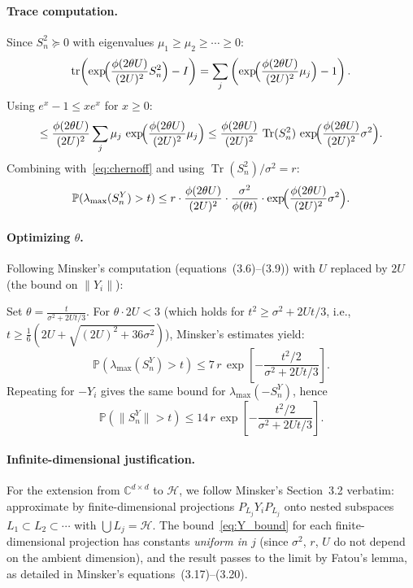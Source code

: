 \documentclass[11pt]{article}
\DeclareMathOperator{\Tr}{Tr}
\DeclareMathOperator{\tr}{tr}
\newcommand{\PP}{\mathbb{P}}
\newcommand{\cH}{\mathcal{H}}
\newcommand{\norm}[1]{\|#1\|}
\begin{document}
\paragraph{Trace computation.}
Since $S_n^2\succeq 0$ with eigenvalues $\mu_1\geq\mu_2\geq\cdots\geq 0$:
\[
\tr\!\left(\exp\!\Bigl(\frac{\phi(2\theta U)}{(2U)^2}S_n^2\Bigr)-I\right)
= \sum_j\left(\exp\!\Bigl(\frac{\phi(2\theta U)}{(2U)^2}\mu_j\Bigr)-1\right).
\]
Using $e^x-1\leq xe^x$ for $x\geq 0$:
\[
\leq \frac{\phi(2\theta U)}{(2U)^2}\sum_j\mu_j\,\exp\!\Bigl(\frac{\phi(2\theta U)}{(2U)^2}\mu_j\Bigr)
\leq \frac{\phi(2\theta U)}{(2U)^2}\,\Tr(S_n^2)\,\exp\!\Bigl(\frac{\phi(2\theta U)}{(2U)^2}\sigma^2\Bigr).
\]
Combining with~\eqref{eq:chernoff} and using $\Tr(S_n^2)/\sigma^2=r$:
\begin{equation}\label{eq:combined}
\PP(\lambda_{\max}(S_n^Y)>t)
\leq r\cdot\frac{\phi(2\theta U)}{(2U)^2}\cdot\frac{\sigma^2}{\phi(\theta t)}
\cdot\exp\!\Bigl(\frac{\phi(2\theta U)}{(2U)^2}\sigma^2\Bigr).
\end{equation}

\paragraph{Optimizing $\theta$.}
Following Minsker's computation (equations~(3.6)--(3.9)) with $U$ replaced by $2U$ (the bound on $\norm{Y_i}$):

Set $\theta=\frac{t}{\sigma^2+2Ut/3}$. For $\theta\cdot 2U<3$ (which holds for $t^2\geq\sigma^2+2Ut/3$, i.e., $t\geq\frac{1}{6}(2U+\sqrt{(2U)^2+36\sigma^2})$), Minsker's estimates yield:
\[
\PP(\lambda_{\max}(S_n^Y)>t)
\leq 7\,r\,\exp\!\left[-\frac{t^2/2}{\sigma^2+2Ut/3}\right].
\]
Repeating for $-Y_i$ gives the same bound for $\lambda_{\max}(-S_n^Y)$, hence
\begin{equation}\label{eq:Y_bound}
\PP(\norm{S_n^Y}>t)\leq 14\,r\,\exp\!\left[-\frac{t^2/2}{\sigma^2+2Ut/3}\right].
\end{equation}

\paragraph{Infinite-dimensional justification.}
For the extension from $\mathbb{C}^{d\times d}$ to $\cH$, we follow Minsker's Section~3.2 verbatim: approximate by finite-dimensional projections $P_{L_j}Y_iP_{L_j}$ onto nested subspaces $L_1\subset L_2\subset\cdots$ with $\bigcup L_j=\cH$. The bound~\eqref{eq:Y_bound} for each finite-dimensional projection has constants \emph{uniform in $j$} (since $\sigma^2$, $r$, $U$ do not depend on the ambient dimension), and the result passes to the limit by Fatou's lemma, as detailed in Minsker's equations~(3.17)--(3.20).
\end{document}
